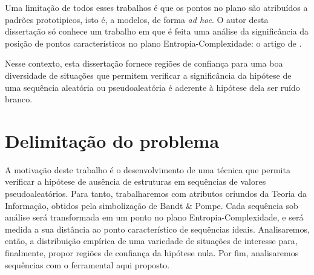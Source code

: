 Uma limitação de todos esses trabalhos é que os pontos no plano são atribuídos a padrões prototipicos, isto é, a modelos, de forma \textit{ad hoc}.
O autor desta dissertação só conhece um trabalho em que é feita uma análise da significância da posição de pontos característicos no plano Entropia-Complexidade: o artigo de \citet{NewPermutationEntropy}.

Nesse contexto, esta dissertação fornece regiões de confiança para uma boa diversidade de situações que permitem verificar a significância da hipótese de uma sequência aleatória ou pseudoaleatória é aderente à hipótese dela ser ruído branco.

\section{Delimitação do problema} %

A motivação deste trabalho é o desenvolvimento de uma técnica que permita verificar a hipótese de ausência de estruturas em sequências de valores pseudoaleatórios.
Para tanto, trabalharemos com atributos oriundos da Teoria da Informação, obtidos pela simbolização de Bandt \& Pompe.
Cada sequência sob análise será transformada em um ponto no plano Entropia-Complexidade, e será medida a sua distância ao ponto característico de sequências ideais.
Analisaremos, então, a distribuição empírica de uma variedade de situações de interesse para, finalmente, propor regiões de confiança da hipótese nula.
Por fim, analisaremos sequências com o ferramental aqui proposto.
